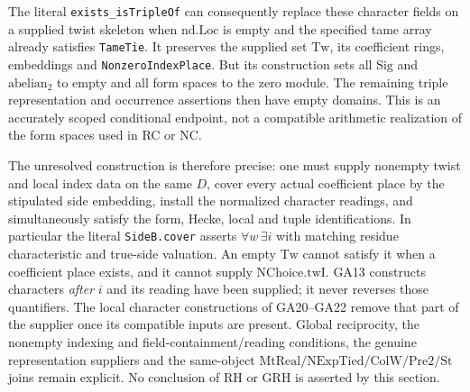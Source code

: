 The literal \texttt{exists\_isTripleOf} can consequently
replace these character fields on a supplied twist
skeleton when $\mathrm{nd.Loc}$ is empty and the
specified tame array already satisfies
\texttt{TameTie}. It preserves the supplied set
$\mathrm{Tw}$, its coefficient rings, embeddings and
\texttt{NonzeroIndexPlace}. But its construction sets
all $\mathrm{Sig}$ and $\mathrm{abelian}_2$ to empty
and all form spaces to the zero module. The remaining
triple representation and occurrence assertions then
have empty domains. This is an accurately scoped
conditional endpoint, not a compatible arithmetic
realization of the form spaces used in RC or NC.

The unresolved construction is therefore precise:
one must supply nonempty twist and local index data on
the same $D$, cover every actual coefficient place by
the stipulated side embedding, install the normalized
character readings, and simultaneously satisfy the
form, Hecke, local and tuple identifications.
In particular the literal \texttt{SideB.cover} asserts
$\forall w\,\exists i$ with matching residue
characteristic and true-side valuation.
An empty $\mathrm{Tw}$ cannot satisfy it when a
coefficient place exists, and it cannot supply
$\mathrm{NChoice.twI}$.
GA13 constructs characters \emph{after} $i$ and its
reading have been supplied; it never reverses those
quantifiers. The local character constructions of
GA20--GA22 remove that part of the supplier once its
compatible inputs are present. Global reciprocity,
the nonempty indexing and field-containment/reading
conditions, the genuine representation suppliers and
the same-object $\mathrm{MtReal}/\mathrm{NExpTied}/
\mathrm{ColW}/\mathrm{Pre2}/\mathrm{St}$ joins remain
explicit. No conclusion of RH or GRH is asserted by
this section.
